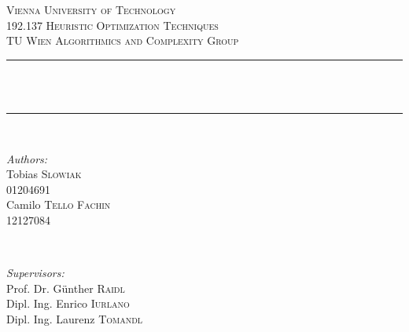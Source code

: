 \begin{titlepage}

\newcommand{\HRule}{\rule{\linewidth}{0.5mm}} %

\center %
 

\textsc{\LARGE Vienna University of Technology}\\[1.5cm] %
\textsc{\Large 192.137 Heuristic Optimization Techniques}\\[0.5cm] %
\textsc{\large TU Wien Algorithmics and Complexity Group}\\[0.5cm] %


\HRule \\[0.5cm]
{ \huge \bfseries \doctitle}\\[1mm] %
\HRule \\[0.5cm]
 
\hfill

\begin{minipage}{0.58\textwidth}
\begin{flushleft} \large
\emph{Authors:}\\
\null
Tobias \textsc{Slowiak}\\
01204691 \\
\null
Camilo \textsc{Tello Fachin}\\
12127084 \\

\end{flushleft}
\end{minipage}
~
\begin{minipage}{0.4\textwidth}
\begin{flushleft} \large
\emph{Supervisors:} \\
\null
Prof. Dr. Günther \textsc{Raidl} \\ %
\null
Dipl. Ing. Enrico \textsc{Iurlano} \\ %
\null
Dipl. Ing. Laurenz \textsc{Tomandl} \\ %
\null
\end{flushleft}
\end{minipage}\\[1.5cm]
\hfill


\end{titlepage}
